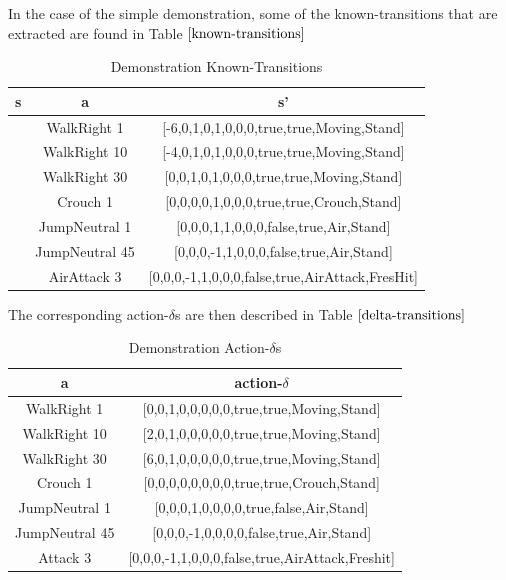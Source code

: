 In the case of the simple demonstration, some of the known-transitions that are extracted are found in Table $\ref{known-transitions}$

\begin{table}[h]
	\centering
	\small
	\begin{tabular}{| c | c | c |}
		\hline
		s & a & s' \\
		\hline
		[-6,0,0,0,1,0,0,0,true,true,Stand,Stand] & WalkRight 1 & [-6,0,1,0,1,0,0,0,true,true,Moving,Stand]\\
		\hline
		[-6,0,0,0,1,0,0,0,true,true,Stand,Stand] & WalkRight 10 & [-4,0,1,0,1,0,0,0,true,true,Moving,Stand]\\
		\hline
		[-6,0,0,0,1,0,0,0,true,true,Stand,Stand] & WalkRight 30 & [0,0,1,0,1,0,0,0,true,true,Moving,Stand]\\
		\hline
		[0,0,1,0,1,0,0,0,true,true,Moving,Stand] & Crouch 1 & [0,0,0,0,1,0,0,0,true,true,Crouch,Stand]\\
		\hline
		[0,0,1,0,1,0,0,0,true,true,Crouch,Stand] & JumpNeutral 1 & [0,0,0,1,1,0,0,0,false,true,Air,Stand]\\
		\hline
		[0,0,1,0,1,0,0,0,true,true,Crouch,Stand] & JumpNeutral 45 & [0,0,0,-1,1,0,0,0,false,true,Air,Stand]\\
		\hline
		[0,0,0,-1,1,0,0,0,false,true,Air,Stand] & AirAttack 3 & [0,0,0,-1,1,0,0,0,false,true,AirAttack,FresHit]\\
		\hline
	\end{tabular}
	\caption{Demonstration Known-Transitions}
	\label{known-transitions}
\end{table}

\newpage

The corresponding action-$\delta$s are then described in Table $\ref{delta-transitions}$

\begin{table}[h]
	\centering
	\begin{tabular}{| c | c |}
		\hline
		a & action-$\delta$ \\
		\hline
		WalkRight 1 & [0,0,1,0,0,0,0,0,true,true,Moving,Stand]\\
		\hline
		WalkRight 10 & [2,0,1,0,0,0,0,0,true,true,Moving,Stand]\\
		\hline
		WalkRight 30 & [6,0,1,0,0,0,0,0,true,true,Moving,Stand]\\
		\hline
		Crouch 1 & [0,0,0,0,0,0,0,0,true,true,Crouch,Stand]\\
		\hline
		JumpNeutral 1 & [0,0,0,1,0,0,0,0,true,false,Air,Stand]\\
		\hline
		JumpNeutral 45 & [0,0,0,-1,0,0,0,0,false,true,Air,Stand]\\
		\hline
		Attack 3 & [0,0,0,-1,1,0,0,0,false,true,AirAttack,Freshit]\\
		\hline
	\end{tabular}
	\caption{Demonstration Action-$\delta$s}
	\label{delta-transitions}
\end{table}

